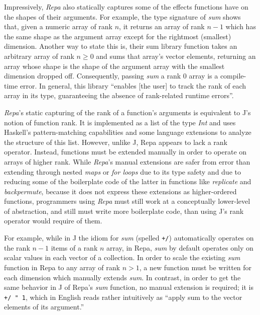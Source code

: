 Impressively, \textit{Repa} also statically captures some of the effects functions have on the shapes of their arguments.
For example, the type signature of \textit{sum} shows that, given a numeric array of rank $n$, 
it returns an array of rank $n-1$ which has the same shape as the argument array 
except for the rightmost (smallest) dimension.
Another way to state this is, their sum library function takes an arbitrary array of rank $n \ge 0$ 
and sums that array's vector elements, 
returning an array whose shape is the shape of the argument array with the smallest dimension dropped off.
Consequently, passing \textit{sum} a rank 0 array is a compile-time error.
In general, this library ``enables [the user] to track the rank of each array in its type,
guaranteeing the absence of rank-related runtime errors''\cite{dph}.

\textit{Repa}'s static capturing of the rank of a function's arguments is equivalent to J's notion of function rank.
It is implemented as a list of the type \textit{Int} and 
uses Haskell's pattern-matching capabilities and some language extensions to analyze the structure of this list.
However, unlike J, Repa appears to lack a rank operator.
Instead, functions must be extended manually in order to operate on arrays of higher rank. 
While \textit{Repa}'s manual extensions are 
safer from error than extending through nested \textit{maps} or \textit{for loops} 
due to its type safety and due to reducing some of the boilerplate code of the latter 
in functions like \textit{replicate} and \textit{backpermute}, 
because it does not express these extensions as higher-ordered functions, 
programmers using \textit{Repa} must still work at a conceptually lower-level of abstraction, 
and still must write more boilerplate code, than using J's rank operator would require of them.

For example, while in J the idiom for \textit{sum} (spelled \texttt{+/}) 
automatically operates on the rank $n-1$ items of a rank $n$ array, 
in Repa, \textit{sum} by default operates only on scalar values in each vector of a collection.
In order to scale the existing \textit{sum} function in Repa to any array of rank $n > 1$, 
a new function must be written for each dimension which manually extends \textit{sum}\cite{dph}.
In contrast, in order to get the same behavior in J of Repa's \textit{sum} function, no manual extension is required; 
it is \texttt{+/ " 1}, which in English reads rather intuitively as ``apply sum to the vector elements of its argument.''

